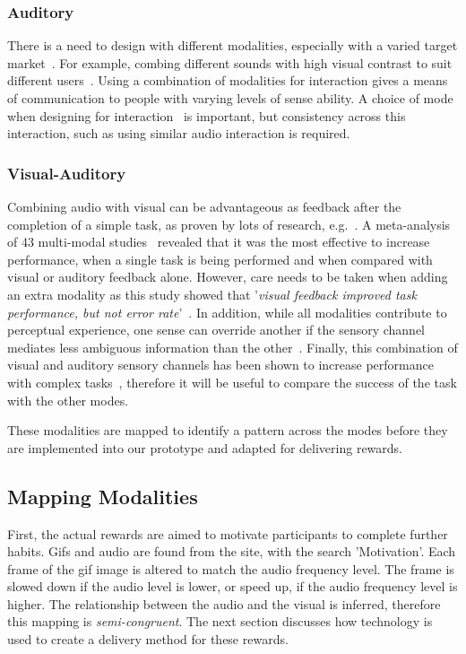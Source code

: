 \documentclass{scaffold/sigchi}
\begin{document}
\subsubsection{Auditory}
There is a need to design with different modalities, especially with a varied target market~\cite{article_designing_for_health_behaviour_change_hci}. For example, combing different sounds with high visual contrast to suit different users~\cite{article_movipill_improving_medication_elders}. Using a combination of modalities for interaction gives a means of communication to people with varying levels of sense ability. A choice of mode when designing for interaction~\cite{article_user_centred_multimodal_reminders} is important, but consistency across this interaction, such as using similar audio interaction is required.

\subsubsection{Visual-Auditory}
Combining audio with visual can be advantageous as feedback after the completion of a simple task, as proven by lots of research, e.g.~\cite{benefits_of_audio_visual_1, benefits_of_audio_visual_2}. A meta-analysis of 43 multi-modal studies~\cite{comparing_modalities_effects_of_visual_auditory} revealed that it was the most effective to increase performance, when a single task is being performed and when compared with visual or auditory feedback alone. However, care needs to be taken when adding an extra modality as this study showed that '\textit{visual feedback improved task performance, but not error rate}'~\cite{comparing_modalities_effects_of_visual_auditory}. In addition, while all modalities contribute to perceptual experience, one sense can override another if the sensory channel mediates less ambiguous information than the other~\cite{one_mode_override_another}. Finally, this combination of visual and auditory sensory channels has been shown to increase performance with complex tasks~\cite{chi_oussama_tap_the_shapetones}, therefore it will be useful to compare the success of the task with the other modes.

These modalities are mapped to identify a pattern across the modes before they are implemented into our prototype and adapted for delivering rewards.

\subsection{Mapping Modalities}
First, the actual rewards are aimed to motivate participants to complete further habits. Gifs and audio are found from the site, with the search 'Motivation'. Each frame of the gif image is altered to match the audio frequency level. The frame is slowed down if the audio level is lower, or speed up, if the audio frequency level is higher. The relationship between the audio and the visual is inferred, therefore this mapping is \textit{semi-congruent}. The next section discusses how technology is used to create a delivery method for these rewards.
\end{document}
